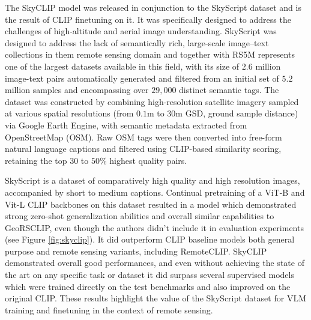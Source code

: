 \documentclass[a4paper, oneside, english]{sapthesis} %
\begin{document}
The SkyCLIP model \cite{wang2024skyscript} was released in conjunction to the SkyScript dataset and is the result of CLIP finetuning on it. It was specifically designed to address the challenges of high-altitude and aerial image understanding. SkyScript was designed to address the lack of semantically rich, large-scale image–text collections in them remote sensing domain and together with RS5M \cite{zhang2024rs5m} represents one of the largest datasets available in this field, with its size of $2.6$ million image-text pairs automatically generated and filtered from an initial set of $5.2$ million samples and encompassing over $29,000$ distinct semantic tags. The dataset was constructed by combining high-resolution satellite imagery sampled at various spatial resolutions (from $0.1$m to $30$m GSD, ground sample distance) via Google Earth Engine, with semantic metadata extracted from OpenStreetMap (OSM). Raw OSM tags were then converted into free-form natural language captions and filtered using CLIP-based similarity scoring, retaining the top $30$ to $50\%$ highest quality pairs.

SkyScript is a dataset of comparatively high quality and high resolution images, accompanied by short to medium captions. Continual pretraining of a ViT-B and Vit-L CLIP backbones on this dataset resulted in a model which demonstrated strong zero-shot generalization abilities and overall similar capabilities to GeoRSCLIP, even though the authors didn't include it in evaluation experiments (see Figure \ref{fig:skyclip}). It did outperform CLIP baseline models both general purpose and remote sensing variants, including RemoteCLIP. SkyCLIP demonstrated overall good performances, and even without achieving the state of the art on any specific task or dataset it did surpass several supervised models which were trained directly on the test benchmarks and also improved on the original CLIP. These results highlight the value of the SkyScript dataset for VLM training and finetuning in the context of remote sensing.
\end{document}

